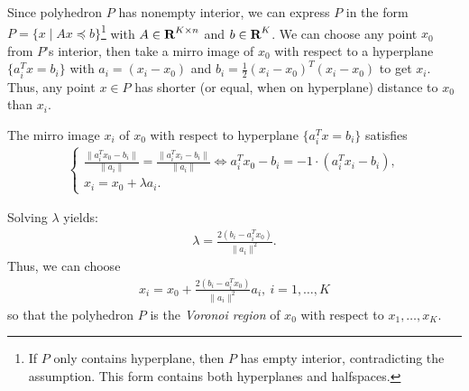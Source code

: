 \documentclass[12pt]{article}
\begin{document}
\begin{solution}[2.9(b)]

	Since polyhedron $P$ has nonempty interior, we can express $P$ in the form $P=\{ x \mid Ax \preceq b\}$\footnote{If $P$ only contains hyperplane, then $P$ has empty interior, contradicting the assumption. This form contains both hyperplanes and halfspaces.} with $A \in {\mbox{\bf R}}^{K\times n} $ and $b\in {\mbox{\bf R}}^{K} $.
	We can choose any point $x_0$ from $P$'s interior, then take a mirro image of $x_0$ with respect to a hyperplane $\{a_i^T x = b_i\}$ with $a_{i} = (x_{i}-x_0)$ and $b_{i} = \frac{1}{2}(x_i-x_0)^T(x_i-x_0)$ to get $x_{i}$.
	Thus, any point $x\in P$ has shorter (or equal, when on hyperplane) distance to $x_0$ than $x_{i}$.

	The mirro image $x_{i}$ of $x_0$ with respect to hyperplane $\{a_i^T x = b_i\}$ satisfies
	\begin{align*}
		\begin{cases}
		\frac{\|a_{i}^{T} x_0-b_{i}\|}{\|a_{i}\|} =	\frac{\|a_{i}^{T} x_i-b_{i}\|}{\|a_{i}\|} \Longleftrightarrow a_{i}^{T} x_0-b_{i} = -1\cdot(a_{i}^{T} x_i-b_{i}), \\
x_{i} = x_0 + \lambda a_{i}.
		\end{cases}
	\end{align*}

	Solving $\lambda$ yields:
	\begin{align*}
		\lambda = \frac{2(b_{i}-a_{i}^Tx_0)}{\|a_{i}\|^2}
	.\end{align*}
	Thus, we can choose  
	\begin{align*}
		x_{i} = x_0 + \frac{2(b_{i}-a_{i}^Tx_0)}{\|a_{i}\|^2}a_{i},\ i = 1, \ldots, K
	\end{align*}
	so that the polyhedron $P$ is the \textit{Voronoi region} of $x_0$ with respect to $x_1,\ldots, x_{K}$.

\end{solution}

\begin{solution}[2.9(c)]

	
\end{solution}
\end{document}
